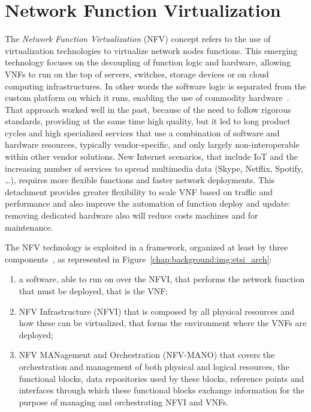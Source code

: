 \section{Network Function Virtualization}
The \emph{Network Function Virtualization} (NFV) concept refers to the use of
virtualization technologies to virtualize network nodes functions. This emerging
technology focuses on the decoupling of function logic and hardware, allowing
VNFs to run on the top of servers, switches, storage devices or on cloud
computing infrastructures. In other words the software logic is separated from
the custom platform on which it runs, enabling the use of commodity
hardware~\cite{gray2016network}. That approach worked well in the past, because
of the need to follow rigorous standards, providing at the same time high
quality, but it led to long product cycles and high specialized services that
use a combination of software and hardware resources, typically vendor-specific,
and only largely non-interoperable within other vendor solutions. New Internet
scenarios, that include IoT and the increasing number of services to spread
multimedia data (Skype, Netflix, Spotify, \dots), requires more flexible
functions and faster network deployments. This detachment provides greater
flexibility to scale VNF based on traffic and performance and also improve the
automation of function deploy and update: removing dedicated hardware also will
reduce costs machines and for maintenance.

The NFV technology is exploited in a framework, organized
at least by three components~\cite{etsi2013gs}, as represented in
Figure~\ref{chap:background:img:etsi_arch}:
\begin{enumerate}
  \item a software, able to run on over the NFVI, that performs the network
  function that must be deployed, that is the VNF;
  \item NFV Infrastructure (NFVI) that is composed by all physical resources
  and how these can be virtualized, that forms the environment where the VNFs
  are deployed;
  \item NFV MANagement and Orchestration (NFV-MANO) that covers the
  orchestration and management of both physical and logical resources, the
  functional blocks, data repositories used by these blocks, reference points
  and interfaces through which these functional blocks exchange
  information for the purpose of managing and orchestrating NFVI and VNFs.
\end{enumerate}

